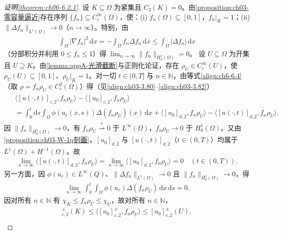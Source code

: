 \documentclass[../../main.tex]{subfiles}%
\begin{document}
\begin{proof}[证明\cref{theorem:ch06-6.2.1}]
设 $K\subseteq\Omega$ 为紧集且 $C_2(K)=0$。由\cref{proposition:ch03-零容量逼近}存在序列 $\{f_n\}\subseteq C^\infty_c(\Omega)$，使：(i) $f_n(\Omega)\subseteq[0,1]$，$f_n|_K=1$；(ii) $\|\Delta f_n\|_{L^1(\Omega)}\to0$（$n\to\infty$）。特别，由
\begin{align*}
\int_\Omega|\nabla f_n|^2\,\mathrm{d}x=-\int_\Omega f_n\Delta f_n\,\mathrm{d}x\leqslant\int_\Omega|\Delta f_n|\,\mathrm{d}x
\end{align*}
（分部积分并利用 $0\leqslant f_n\leqslant1$）得 $\lim_{n\to\infty}\|f_n\|_{H^1_0(\Omega)}=0$。
设 $U\subseteq\Omega$ 为开集且 $U\supseteq K$。由\cref{lemma:appA-光滑截断}与正则化论证，存在 $\rho_U\in C^\infty_c(U)$，使 $\rho_U(U)\subseteq[0,1]$、$\rho_U|_K=1$。对一切 $t\in(0,T]$ 与 $n\in\mathbb{N}$，由等式\eqref{align:ch6-6.4}（取 $\rho=f_n\rho_U\in C^2_c(\Omega)$）得（见\eqref{align:ch03-3.80}--\eqref{align:ch03-3.82}）
\begin{align}
\begin{aligned}
&\langle[u(\cdot,t)]_{c,2},f_n\rho_U\rangle-\langle[u_0]_{c,2},f_n\rho_U\rangle\\
&= \int_0^t\mathrm{d}s\int_\Omega\phi(u_r(x,s))\Delta(f_n\rho_U)(x)\,\mathrm{d}x
+\langle[u_0]_{d,2},f_n\rho_U\rangle-\langle[u(\cdot,t)]_{d,2},f_n\rho_U\rangle .
\end{aligned}
\label{align:ch6-6.13}
\end{align}
因 $\|f_n\|_{H^1_0(\Omega)}\to0$，有 $f_n\rho_U\stackrel{*}{\rightharpoonup}0$ 于 $L^\infty(\Omega)$，$f_n\rho_U\to0$ 于 $H^1_0(\Omega)$。又由\cref{proposition:ch03-W-1q刻画}，$[u_0]_{d,2}$ 与 $[u(\cdot,t)]_{d,2}$（$t\in(0,T)$）均属于 $L^1(\Omega)+H^{-1}(\Omega)$。故
\begin{align}
\lim_{n\to\infty}\langle[u(\cdot,t)]_{d,2},f_n\rho_U\rangle
=\lim_{n\to\infty}\langle[u_0]_{d,2},f_n\rho_U\rangle=0
\quad(t\in(0,T)). \label{align:ch6-6.14}
\end{align}
另一方面，因 $\phi(u_r)\in L^\infty(Q)$、$\|\Delta f_n\|_{L^1(\Omega)}\to0$ 且 $\|f_n\|_{H^1_0(\Omega)}\to0$，得
\begin{align}
\lim_{n\to\infty}\int_0^t\int_\Omega\phi(u_r)\Delta(f_n\rho_U)\,\mathrm{d}x\,\mathrm{d}s=0. \label{align:ch6-6.15}
\end{align}
因对所有 $n\in\mathbb{N}$ 有 $\chi_K\leqslant f_n\rho_U\leqslant\chi_U$，故对所有 $n\in\mathbb{N}$，
\begin{align}
[u_0]^\pm_{c,2}(K)\leqslant\langle[u_0]^\pm_{c,2},f_n\rho_U\rangle\leqslant[u_0]^\pm_{c,2}(U), \label{align:ch6-6.16a}\\

\end{align}
\end{proof}
\end{document}
